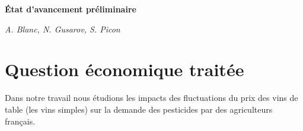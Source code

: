 \documentclass[11pt, a4paper]{article}
\begin{document}
\begin{center}
    \Large\textbf{État d'avancement préliminaire}
    \par
    \large\textit{A. Blanc, N. Gusarov, S. Picon}
\end{center}


\section*{Question économique traitée}
Dans notre travail nous étudions les impacts des fluctuations du prix des vins de table (les vins simples) sur la demande des pesticides par des agriculteurs français.
\end{document}
